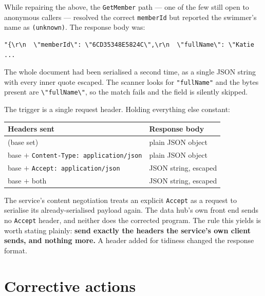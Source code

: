 \documentclass[11pt]{article}
\newcommand{\code}[1]{\texttt{#1}}
\begin{document}
While repairing the above, the \code{GetMember} path --- one of the few
still open to anonymous callers --- resolved the correct
\code{memberId} but reported the swimmer's name as \code{(unknown)}.
The response body was:

\begin{lstlisting}
"{\r\n  \"memberId\": \"6CD35348E5824C\",\r\n  \"fullName\": \"Katie ...
\end{lstlisting}

\noindent The whole document had been serialised a second time, as a
single JSON string with every inner quote escaped.  The scanner looks
for \code{"fullName"} and the bytes present are
\code{\textbackslash"fullName\textbackslash"}, so the match fails and
the field is silently skipped.

The trigger is a single request header.  Holding everything else
constant:

\begin{center}
\begin{tabular}{ll}
\toprule
\textbf{Headers sent} & \textbf{Response body} \\
\midrule
(base set)                              & plain JSON object \\
base $+$ \code{Content-Type: application/json} & plain JSON object \\
base $+$ \code{Accept: application/json}       & \textcolor{bad}{JSON string, escaped} \\
base $+$ both                                  & \textcolor{bad}{JSON string, escaped} \\
\bottomrule
\end{tabular}
\end{center}

\noindent The service's content negotiation treats an explicit
\code{Accept} as a request to serialise its already-serialised payload
again.  The data hub's own front end sends no \code{Accept} header, and
neither does the corrected program.  The rule this yields is worth
stating plainly: \textbf{send exactly the headers the service's own
client sends, and nothing more.}  A header added for tidiness changed
the response format.

\section{Corrective actions}\label{sec:fixes}
\end{document}
